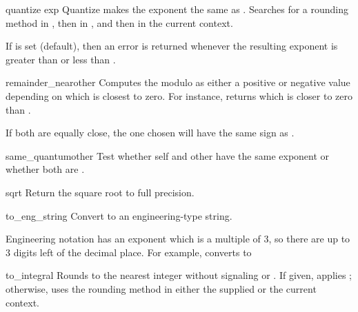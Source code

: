 \begin{methoddesc}{quantize}
  {exp }
  Quantize makes the exponent the same as .  Searches for a
  rounding method in , then in , and then
  in the current context.

  If  is set (default), then an error is returned whenever
  the resulting exponent is greater than  or less than
  .
\end{methoddesc} 

\begin{methoddesc}{remainder_near}{other}
  Computes the modulo as either a positive or negative value depending
  on which is closest to zero.  For instance,
   returns 
  which is closer to zero than .

  If both are equally close, the one chosen will have the same sign
  as .
\end{methoddesc}  

\begin{methoddesc}{same_quantum}{other}
  Test whether self and other have the same exponent or whether both
  are .
\end{methoddesc}

\begin{methoddesc}{sqrt}{}
  Return the square root to full precision.
\end{methoddesc}                    
 
\begin{methoddesc}{to_eng_string}{}
  Convert to an engineering-type string.

  Engineering notation has an exponent which is a multiple of 3, so there
  are up to 3 digits left of the decimal place.  For example, converts
   to 
\end{methoddesc}  

\begin{methoddesc}{to_integral}{}                   
  Rounds to the nearest integer without signaling 
  or .  If given, applies ; otherwise,
  uses the rounding method in either the supplied  or the
  current context.
\end{methoddesc} 



